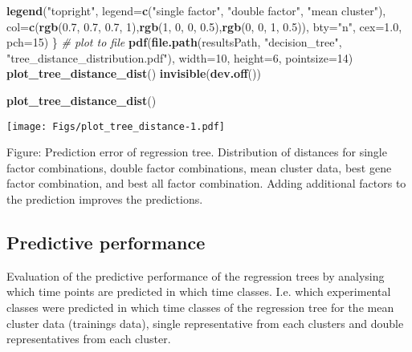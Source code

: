\documentclass[]{article}
\newenvironment{Shaded}{\begin{snugshade}}{\end{snugshade}}
\newcommand{\KeywordTok}[1]{\textcolor[rgb]{0.13,0.29,0.53}{\textbf{{#1}}}}
\newcommand{\DataTypeTok}[1]{\textcolor[rgb]{0.13,0.29,0.53}{{#1}}}
\newcommand{\DecValTok}[1]{\textcolor[rgb]{0.00,0.00,0.81}{{#1}}}
\newcommand{\FloatTok}[1]{\textcolor[rgb]{0.00,0.00,0.81}{{#1}}}
\newcommand{\StringTok}[1]{\textcolor[rgb]{0.31,0.60,0.02}{{#1}}}
\newcommand{\CommentTok}[1]{\textcolor[rgb]{0.56,0.35,0.01}{\textit{{#1}}}}
\newcommand{\NormalTok}[1]{{#1}}
\begin{document}
\begin{Shaded}
\begin{Highlighting}[]
  \KeywordTok{legend}\NormalTok{(}\StringTok{"topright"}\NormalTok{, }\DataTypeTok{legend=}\KeywordTok{c}\NormalTok{(}\StringTok{"single factor"}\NormalTok{, }\StringTok{"double factor"}\NormalTok{, }\StringTok{"mean cluster"}\NormalTok{), }
             \DataTypeTok{col=}\KeywordTok{c}\NormalTok{(}\KeywordTok{rgb}\NormalTok{(}\FloatTok{0.7}\NormalTok{, }\FloatTok{0.7}\NormalTok{, }\FloatTok{0.7}\NormalTok{, }\DecValTok{1}\NormalTok{),}\KeywordTok{rgb}\NormalTok{(}\DecValTok{1}\NormalTok{, }\DecValTok{0}\NormalTok{, }\DecValTok{0}\NormalTok{, }\FloatTok{0.5}\NormalTok{),}\KeywordTok{rgb}\NormalTok{(}\DecValTok{0}\NormalTok{, }\DecValTok{0}\NormalTok{, }\DecValTok{1}\NormalTok{, }\FloatTok{0.5}\NormalTok{)),}
             \DataTypeTok{bty=}\StringTok{"n"}\NormalTok{, }\DataTypeTok{cex=}\FloatTok{1.0}\NormalTok{, }\DataTypeTok{pch=}\DecValTok{15}\NormalTok{)}
\NormalTok{\}}
\CommentTok{# plot to file}
\KeywordTok{pdf}\NormalTok{(}\KeywordTok{file.path}\NormalTok{(resultsPath, }\StringTok{"decision_tree"}\NormalTok{, }\StringTok{"tree_distance_distribution.pdf"}\NormalTok{), }
    \DataTypeTok{width=}\DecValTok{10}\NormalTok{, }\DataTypeTok{height=}\DecValTok{6}\NormalTok{, }\DataTypeTok{pointsize=}\DecValTok{14}\NormalTok{)}
\KeywordTok{plot_tree_distance_dist}\NormalTok{()}
\KeywordTok{invisible}\NormalTok{(}\KeywordTok{dev.off}\NormalTok{())}
\end{Highlighting}
\end{Shaded}

\begin{Shaded}
\begin{Highlighting}[]
\KeywordTok{plot_tree_distance_dist}\NormalTok{()}
\end{Highlighting}
\end{Shaded}

\texttt{[image: Figs/plot\_tree\_distance-1.pdf]}

Figure: Prediction error of regression tree. Distribution of distances
for single factor combinations, double factor combinations, mean cluster
data, best gene factor combination, and best all factor combination.
Adding additional factors to the prediction improves the predictions.

\subsection{Predictive performance}\label{predictive-performance}

Evaluation of the predictive performance of the regression trees by
analysing which time points are predicted in which time classes. I.e.
which experimental classes were predicted in which time classes of the
regression tree for the mean cluster data (trainings data), single
representative from each clusters and double representatives from each
cluster.
\end{document}
